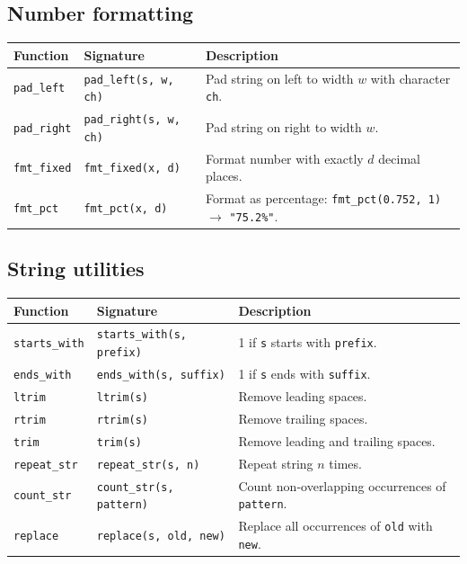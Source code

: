 \documentclass[11pt,a4paper]{article}
\begin{document}
\subsection{Number formatting}

\begin{longtable}{@{}L{3.5cm}L{4.5cm}L{6.5cm}@{}}
\toprule
\textbf{Function} & \textbf{Signature} & \textbf{Description} \\
\midrule
\endhead
\texttt{pad\_left}  & \texttt{pad\_left(s, w, ch)}    & Pad string on left to width $w$ with character \texttt{ch}. \\
\texttt{pad\_right} & \texttt{pad\_right(s, w, ch)}   & Pad string on right to width $w$. \\
\texttt{fmt\_fixed} & \texttt{fmt\_fixed(x, d)}       & Format number with exactly $d$ decimal places. \\
\texttt{fmt\_pct}   & \texttt{fmt\_pct(x, d)}         & Format as percentage: \texttt{fmt\_pct(0.752, 1)} $\to$ \texttt{"75.2\%"}. \\
\bottomrule
\end{longtable}

\subsection{String utilities}

\begin{longtable}{@{}L{3.5cm}L{4.5cm}L{6.5cm}@{}}
\toprule
\textbf{Function} & \textbf{Signature} & \textbf{Description} \\
\midrule
\endhead
\texttt{starts\_with} & \texttt{starts\_with(s, prefix)}   & 1 if \texttt{s} starts with \texttt{prefix}. \\
\texttt{ends\_with}   & \texttt{ends\_with(s, suffix)}     & 1 if \texttt{s} ends with \texttt{suffix}. \\
\texttt{ltrim}        & \texttt{ltrim(s)}                  & Remove leading spaces. \\
\texttt{rtrim}        & \texttt{rtrim(s)}                  & Remove trailing spaces. \\
\texttt{trim}         & \texttt{trim(s)}                   & Remove leading and trailing spaces. \\
\texttt{repeat\_str}  & \texttt{repeat\_str(s, n)}         & Repeat string $n$ times. \\
\texttt{count\_str}   & \texttt{count\_str(s, pattern)}    & Count non-overlapping occurrences of \texttt{pattern}. \\
\texttt{replace}      & \texttt{replace(s, old, new)}      & Replace all occurrences of \texttt{old} with \texttt{new}. \\
\bottomrule
\end{longtable}
\end{document}

